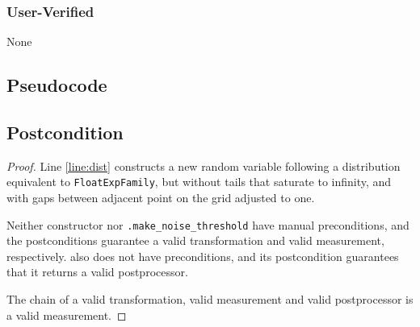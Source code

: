\documentclass{article}
\begin{document}
\subsubsection*{User-Verified}
None

\subsection*{Pseudocode}


\subsection*{Postcondition}
\begin{theorem}
\end{theorem}

\begin{proof}
    Line \ref{line:dist} constructs a new random variable following a distribution equivalent to \texttt{FloatExpFamily}, 
    but without tails that saturate to infinity, and with gaps between adjacent point on the grid adjusted to one.

    Neither constructor  nor
    \texttt{.make\_noise\_threshold} have manual preconditions, 
    and the postconditions guarantee a valid transformation and valid measurement, respectively.
     also does not have preconditions,
    and its postcondition guarantees that it returns a valid postprocessor.

    The chain of a valid transformation, valid measurement and valid postprocessor is a valid measurement.
\end{proof}
\end{document}
